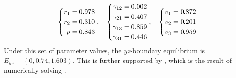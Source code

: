 \begin{equation}
    \begin{dcases}
        \begin{aligned}
            r_1 &= 0.978\\
            r_2 &= 0.310\\
            p &= 0.843
        \end{aligned}
    \end{dcases},\quad 
    \begin{dcases}
        \begin{aligned}
            \gamma_{12} &= 0.002\\
            \gamma_{21} &= 0.407\\
            \gamma_{13} &= 0.859\\
            \gamma_{31} &= 0.446
        \end{aligned}
    \end{dcases},\quad
    \begin{dcases}
        \begin{aligned}
            v_1 &= 0.872\\
            v_2 &= 0.201\\
            v_3 &= 0.959
        \end{aligned}
    \end{dcases} 
    \label{params:6.4}
\end{equation}
Under this set of parameter values, the $yz$-boundary equilibrium is $E_{yz}=(0,0.74,1.603)$. This is further supported by , which is the result of numerically solving .


